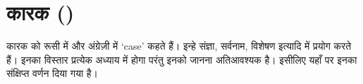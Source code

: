\chapter{कारक ()}\label{ch:cases}

कारक को रूसी में  और अंग्रेज़ी में `case' कहते हैं। इन्हे संज्ञा, सर्वनाम, विशेषण इत्यादि में प्रयोग करते हैं। इनका विस्तार प्रत्येक अध्याय में होगा परंतु इनको
जानना अतिआवश्यक है। इसीलिए यहाँ पर इनका संक्षिप्त वर्णन दिया गया है।











